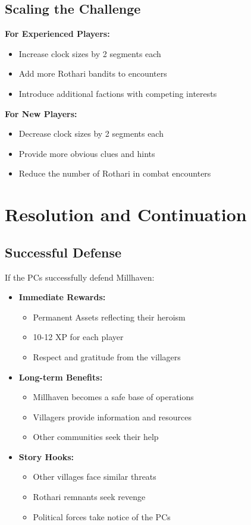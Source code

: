 \documentclass[11pt]{article}
\begin{document}
\subsection{Scaling the Challenge}

\textbf{For Experienced Players:}
\begin{itemize}
\item Increase clock sizes by 2 segments each
\item Add more Rothari bandits to encounters
\item Introduce additional factions with competing interests
\end{itemize}

\textbf{For New Players:}
\begin{itemize}
\item Decrease clock sizes by 2 segments each
\item Provide more obvious clues and hints
\item Reduce the number of Rothari in combat encounters
\end{itemize}

\section{Resolution and Continuation}

\subsection{Successful Defense}

If the PCs successfully defend Millhaven:
\begin{itemize}
\item \textbf{Immediate Rewards:}
   \begin{itemize}
   \item Permanent Assets reflecting their heroism
   \item 10-12 XP for each player
   \item Respect and gratitude from the villagers
   \end{itemize}
\item \textbf{Long-term Benefits:}
   \begin{itemize}
   \item Millhaven becomes a safe base of operations
   \item Villagers provide information and resources
   \item Other communities seek their help
   \end{itemize}
\item \textbf{Story Hooks:}
   \begin{itemize}
   \item Other villages face similar threats
   \item Rothari remnants seek revenge
   \item Political forces take notice of the PCs
   \end{itemize}
\end{itemize}
\end{document}
